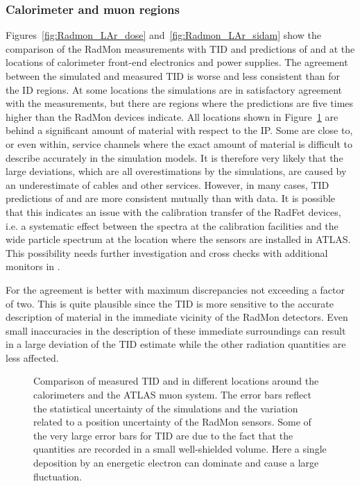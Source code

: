 \documentclass[cernpreprint, atlasdraft=false, UKenglish,british,orcidlogo, texmf, orcidlogo]{atlasdoc}
\begin{document}
\subsubsection{Calorimeter and muon regions}
\label{sss:bkgCaloMuon}
Figures~\ref{fig:Radmon_LAr_dose} and~\ref{fig:Radmon_LAr_sidam} show the comparison of the RadMon measurements
with \gls{TID} and \phieqv predictions of \fluka and  at the locations of calorimeter front-end electronics
and power supplies.
The agreement between the simulated and measured \gls{TID} is worse and less consistent than for the \gls{ID} regions. At some
locations the simulations are in satisfactory agreement with the measurements, but there are regions where the
predictions are five times higher than the RadMon devices indicate. All locations shown in
Figure~\ref{fig:damageComparisonCalo} are behind a significant amount of material with respect
to the \gls{IP}. Some are close to, or even within, service channels where the exact amount of material is difficult to
describe accurately in the simulation models. It is therefore very likely that the large deviations, which are all
overestimations by the simulations, are caused by an underestimate of cables and other services.
However, 
in many cases, \gls{TID} predictions of \fluka and  are more consistent mutually than with data. It is possible that
this indicates an issue with the calibration transfer of the RadFet devices, i.e. a systematic effect between the
spectra at the calibration facilities and the wide particle spectrum at the location where the sensors are installed in ATLAS.
This possibility needs further investigation and cross checks with additional monitors in \RunThr.
 
For \phieqv the agreement is better with maximum discrepancies not exceeding a factor of two. This is quite plausible
since the \gls{TID} is more sensitive to the accurate description of material in the immediate vicinity of the RadMon
detectors. Even small inaccuracies in the description of these immediate surroundings can result in a large deviation
of the \gls{TID} estimate while the other radiation quantities are less affected.
 
\begin{figure}
\begin{center}
\end{center}
\caption{Comparison of measured \protect{} \gls{TID}  and \protect{} \phieqv
in different locations around the calorimeters and the ATLAS muon system. The error bars reflect the statistical uncertainty of
the simulations and the variation related to a position uncertainty of the RadMon sensors. Some of the very large error bars for TID
are due to the fact that the quantities are recorded in a small well-shielded volume. Here a single deposition by an energetic
electron can dominate and cause a large fluctuation.
}
\label{fig:damageComparisonCalo}
\end{figure}
 
\end{document}
